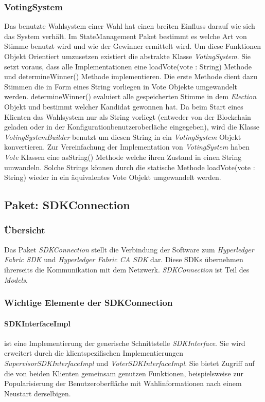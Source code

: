 \documentclass[parskip=full]{scrartcl}
\begin{document}
		\subsubsection{VotingSystem}
		Das benutzte Wahlsystem einer Wahl hat einen breiten Einfluss darauf wie sich das System verhält. Im StateManagement Paket bestimmt es welche Art von Stimme benutzt wird und wie der Gewinner ermittelt wird.
		Um diese Funktionen Objekt Orientiert umzusetzen existiert die abstrakte Klasse \textit{VotingSystem}. Sie setzt voraus, dass alle Implementationen eine loadVote(vote : String) Methode und determineWinner() Methode implementieren. Die erste Methode dient dazu Stimmen die in Form eines String vorliegen in Vote Objekte umgewandelt werden. determineWinner() evaluiert alle gespeicherten Stimme in dem \textit{Election} Objekt und bestimmt welcher Kandidat gewonnen hat.
		Da beim Start eines Klienten das Wahlsystem nur als String vorliegt (entweder von der Blockchain geladen oder in der Konfigurationbenutzeroberläche eingegeben), wird die Klasse \textit{VotingSystemBuilder} benutzt um diesen String in ein \textit{VotingSystem} Objekt konvertieren.
		Zur Vereinfachung der Implementation von \textit{VotingSystem} haben \textit{Vote} Klassen eine asString() Methode welche ihren Zustand in einen String umwandeln. Solche Strings können durch die statische Methode loadVote(vote : String) wieder in ein äquivalentes Vote Objekt umgewandelt werden.

	
	\subsection{Paket: SDKConnection}
	\subsubsection{Übersicht}
	Das Paket \textit{SDKConnection} stellt die Verbindung der Software zum \textit{Hyperledger Fabric SDK} und \textit{Hyperledger Fabric CA SDK} dar. Diese SDKs übernehmen ihrerseits die Kommunikation mit dem Netzwerk. \textit{SDKConnection} ist Teil des \textit{Models}.
	\subsubsection{Wichtige Elemente der SDKConnection}
	\paragraph{SDKInterfaceImpl} ist eine Implementierung der generische Schnittstelle \textit{SDKInterface}. Sie wird erweitert durch die klientspezifischen Implementierungen \textit{SupervisorSDKInterfaceImpl} und \textit{VoterSDKInterfaceImpl}. Sie bietet Zugriff auf die von beiden Klienten gemeinsam genutzen Funktionen, beispielsweise zur Popularisierung der Benutzeroberfläche mit Wahlinformationen nach einem Neustart derselbigen.
\end{document}
